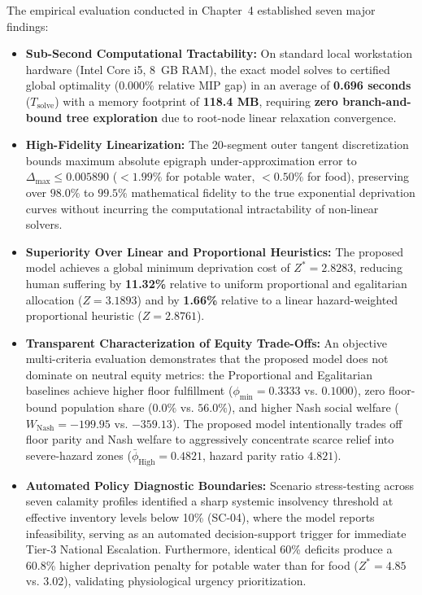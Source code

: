 The empirical evaluation conducted in Chapter~4 established seven major findings:
\begin{itemize}
    \item \textbf{Sub-Second Computational Tractability:} On standard local workstation hardware (Intel Core i5, 8~GB RAM), the exact model solves to certified global optimality ($0.000\%$ relative MIP gap) in an average of \textbf{0.696 seconds} ($T_{\text{solve}}$) with a memory footprint of \textbf{118.4 MB}, requiring \textbf{zero branch-and-bound tree exploration} due to root-node linear relaxation convergence.
    \item \textbf{High-Fidelity Linearization:} The 20-segment outer tangent discretization bounds maximum absolute epigraph under-approximation error to $\Delta_{\max} \le 0.005890$ ($< 1.99\%$ for potable water, $< 0.50\%$ for food), preserving over $98.0\%$ to $99.5\%$ mathematical fidelity to the true exponential deprivation curves without incurring the computational intractability of non-linear solvers.
    \item \textbf{Superiority Over Linear and Proportional Heuristics:} The proposed model achieves a global minimum deprivation cost of $Z^* = \mathbf{2.8283}$, reducing human suffering by \textbf{11.32\%} relative to uniform proportional and egalitarian allocation ($Z = 3.1893$) and by \textbf{1.66\%} relative to a linear hazard-weighted proportional heuristic ($Z = 2.8761$).
    \item \textbf{Transparent Characterization of Equity Trade-Offs:} An objective multi-criteria evaluation demonstrates that the proposed model does not dominate on neutral equity metrics: the Proportional and Egalitarian baselines achieve higher floor fulfillment ($\phi_{\min} = 0.3333$ vs. $0.1000$), zero floor-bound population share ($0.0\%$ vs. $56.0\%$), and higher Nash social welfare ($W_{\text{Nash}} = -199.95$ vs. $-359.13$). The proposed model intentionally trades off floor parity and Nash welfare to aggressively concentrate scarce relief into severe-hazard zones ($\bar{\phi}_{\text{High}} = 0.4821$, hazard parity ratio $4.821$).
    \item \textbf{Automated Policy Diagnostic Boundaries:} Scenario stress-testing across seven calamity profiles identified a sharp systemic insolvency threshold at effective inventory levels below 10\% (SC-04), where the model reports infeasibility, serving as an automated decision-support trigger for immediate Tier-3 National Escalation. Furthermore, identical 60\% deficits produce a 60.8\% higher deprivation penalty for potable water than for food ($Z^* = 4.85$ vs. $3.02$), validating physiological urgency prioritization.

\end{itemize}
